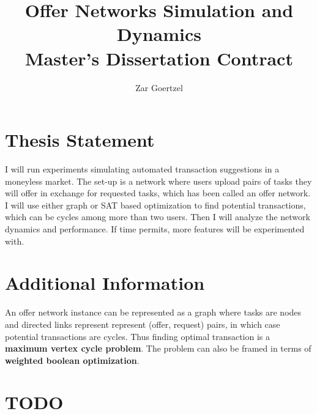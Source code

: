 \documentclass[11pt]{article}
\title{Offer Networks Simulation and Dynamics
	 \\Master's Dissertation Contract}
\author{Zar Goertzel}
\begin{document}
\maketitle

\section{Thesis Statement}
I will run experiments simulating automated transaction suggestions in a moneyless market. The set-up is a network where users upload pairs of tasks they will offer in exchange for requested tasks, which has been called an offer network. I will use either graph or SAT based optimization to find potential transactions, which can be cycles among more than two users. Then I will analyze the network dynamics and performance. If time permits, more features will be experimented with.

\section{Additional Information}
An offer network instance can be represented as a graph where tasks are nodes and directed links represent represent (offer, request) pairs, in which case potential transactions are cycles. Thus finding optimal transaction is a \textbf{maximum vertex cycle problem}. The problem can also be framed in terms of \textbf{weighted boolean optimization}.

\newpage
\section{TODO}
\end{document}
